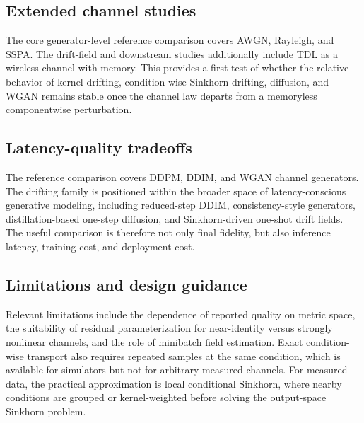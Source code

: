 \subsection{Extended channel studies}
The core generator-level reference comparison covers AWGN, Rayleigh, and SSPA.
The drift-field and downstream studies additionally include TDL as a wireless channel with memory.
This provides a first test of whether the relative behavior of kernel drifting, condition-wise Sinkhorn drifting, diffusion, and WGAN remains stable once the channel law departs from a memoryless componentwise perturbation.

\subsection{Latency-quality tradeoffs}
The reference comparison covers DDPM, DDIM, and WGAN channel generators.
The drifting family is positioned within the broader space of latency-conscious generative modeling, including reduced-step DDIM, consistency-style generators, distillation-based one-step diffusion, and Sinkhorn-driven one-shot drift fields.
The useful comparison is therefore not only final fidelity, but also inference latency, training cost, and deployment cost.

\subsection{Limitations and design guidance}
Relevant limitations include the dependence of reported quality on metric space, the suitability of residual parameterization for near-identity versus strongly nonlinear channels, and the role of minibatch field estimation.
Exact condition-wise transport also requires repeated samples at the same condition, which is available for simulators but not for arbitrary measured channels.
For measured data, the practical approximation is local conditional Sinkhorn, where nearby conditions are grouped or kernel-weighted before solving the output-space Sinkhorn problem.
